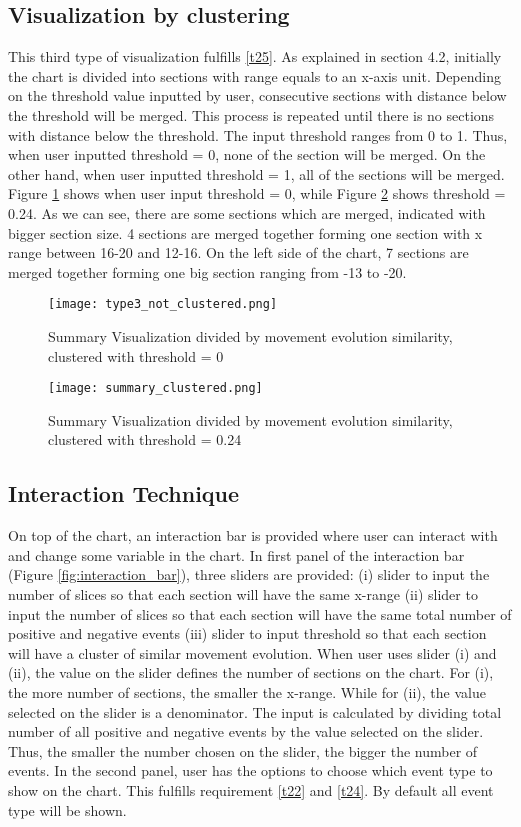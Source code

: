 \subsection{Visualization by clustering}
This third type of visualization fulfills \ref{t25}. As explained in section 4.2, initially the chart is divided into sections with range equals to an x-axis unit. Depending on the threshold value inputted by user, consecutive sections with distance below the threshold will be merged. This process is repeated until there is no sections with distance below the threshold. The input threshold ranges from 0 to 1. Thus, when user inputted threshold = 0, none of the section will be merged. On the other hand, when user inputted threshold = 1, all of the sections will be merged. Figure \ref{fig:type3_not_clustered} shows when user input threshold = 0, while Figure \ref{fig:type3_clustered} shows threshold = 0.24. As we can see, there are some sections which are merged, indicated with bigger section size. 4 sections are merged together forming one section with x range between 16-20 and 12-16. On the left side of the chart, 7 sections are merged together forming one big section ranging from -13 to -20.

\begin{figure}
\centering
\texttt{[image: type3\_not\_clustered.png]}
\caption{Summary Visualization divided by movement evolution similarity, clustered with threshold = 0}
\label{fig:type3_not_clustered}
\end{figure}

\begin{figure}
\centering
\texttt{[image: summary\_clustered.png]}
\caption{Summary Visualization divided by movement evolution similarity, clustered with threshold = 0.24}
\label{fig:type3_clustered}
\end{figure}

\subsection{Interaction Technique}
On top of the chart, an interaction bar is provided where user can interact with and change some variable in the chart. In first panel of the interaction bar (Figure \ref{fig:interaction_bar}), three sliders are provided: (i) slider to input the number of slices so that each section will have the same x-range (ii) slider to input the number of slices so that each section will have the same total number of positive and negative events (iii) slider to input threshold so that each section will have a cluster of similar movement evolution. When user uses slider (i) and (ii), the value on the slider defines the number of sections on the chart. For (i), the more number of sections, the smaller the x-range. While for (ii), the value selected on the slider is a denominator. The input is calculated by dividing total number of all positive and negative events by the value selected on the slider. Thus, the smaller the number chosen on the slider, the bigger the number of events. In the second panel, user has the options to choose which event type to show on the chart. This fulfills requirement \ref{t22} and \ref{t24}. By default all event type will be shown. 

